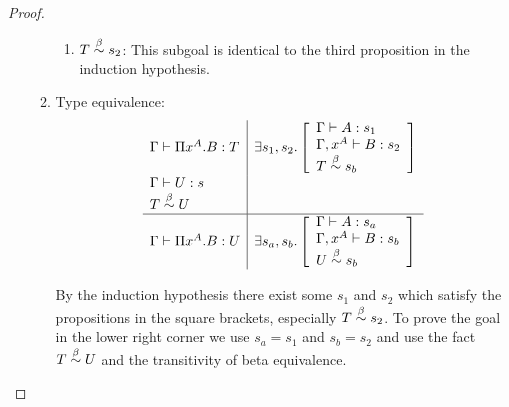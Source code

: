 \begin{theorem}
\begin{proof}
\begin{enumerate}
\begin{enumerate}
\begin{enumerate}
                \item $T \stackrel{\beta}{\sim} s_2$: This subgoal is identical to the third
                        proposition in the induction hypothesis.
                \end{enumerate}

            \item Type equivalence:
                $$
                \begin{array}{l|l}
                    \Gamma \vdash \Pi x^A. B : T
                    &
                    \exists s_1, s_2.
                    \left[
                    \begin{array}{l}
                        \Gamma \vdash A : s_1
                        \\
                        \Gamma, x^A \vdash B : s_2
                        \\
                        T \stackrel{\beta}{\sim} s_b
                    \end{array}
                    \right]
                    \\
                    \Gamma \vdash U : s
                    \\
                    T \stackrel{\beta}{\sim} U
                    \\
                    \hline
                    \Gamma \vdash \Pi x^A. B : U
                    &
                    \exists s_a, s_b.
                    \left[
                    \begin{array}{l}
                        \Gamma \vdash A : s_a
                        \\
                        \Gamma, x^A \vdash B : s_b
                        \\
                        U \stackrel{\beta}{\sim} s_b
                    \end{array}
                    \right]
                \end{array}
                $$

                By the induction hypothesis there exist some $s_1$ and $s_2$
                which satisfy the propositions in the square brackets,
                especially $T \stackrel{\beta}{\sim} s_2$. To prove the goal in the lower right
                corner we use $s_a = s_1$ and $s_b = s_2$ and use the fact $T
                \stackrel{\beta}{\sim} U$ and the transitivity of beta equivalence.

            \end{enumerate}
        \end{enumerate}
    \end{proof}
\end{theorem}



